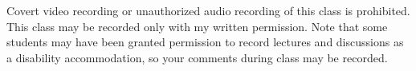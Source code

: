 Covert video recording or unauthorized audio recording of this class is
prohibited. This class may be recorded only with my written permission. Note
that some students may have been granted permission to record lectures and
discussions as a disability accommodation, so your comments during class may be
recorded.
